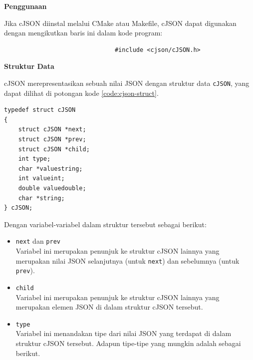 \documentclass[a4paper,twoside]{article}
\begin{document}
\begin{enumerate}
\textbf{Penggunaan}
\label{sec:cmodules-cJSON-usage}

Jika cJSON diinstal melalui CMake atau Makefile, cJSON dapat digunakan dengan mengikutkan baris ini dalam kode program:

\begin{verbatim}
                               #include <cjson/cJSON.h>
\end{verbatim}

\textbf{Struktur Data}
\label{sec:cmodules-cJSON-datastruct}

cJSON merepresentasikan sebuah nilai JSON dengan struktur data \verb|cJSON|, yang dapat dilihat di potongan kode \ref{code:cjson-struct}.

\begin{lstlisting}[caption=Struktur data cJSON, label=code:cjson-struct]
typedef struct cJSON
{
    struct cJSON *next;
    struct cJSON *prev;
    struct cJSON *child;
    int type;
    char *valuestring;
    int valueint;
    double valuedouble;
    char *string;
} cJSON;
\end{lstlisting}
\noindent
Dengan variabel-variabel dalam struktur tersebut sebagai berikut:

\begin{itemize}
	\item \verb|next| dan \verb|prev|\\
	Variabel ini merupakan penunjuk ke struktur cJSON lainnya yang merupakan nilai JSON \linebreak selanjutnya (untuk \verb|next|) dan sebelumnya (untuk \verb|prev|).
	\item \verb|child|\\
	Variabel ini merupakan penunjuk ke struktur cJSON lainnya yang merupakan elemen JSON di dalam struktur cJSON tersebut.
	\item \verb|type|\\
	Variabel ini menandakan tipe dari nilai JSON yang terdapat di dalam struktur cJSON tersebut. Adapun tipe-tipe yang mungkin adalah sebagai berikut.
	

\end{itemize}
\end{enumerate}
\end{document}
